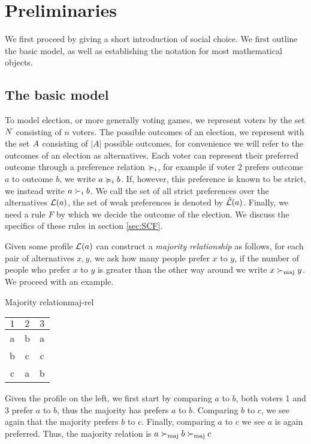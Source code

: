 \chapter{Preliminaries}
We first proceed by giving a short introduction of social choice. We first outline the basic model, as well as establishing the notation for most mathematical objects.

\section{The basic model}
To model election, or more generally voting games, we represent voters by the set $N$ consisting of $n$ voters. The possible outcomes of an election, we represent with the set $A$ consisting of $|A|$ possible outcomes, for convenience we will refer to the outcomes of an election as alternatives. Each voter can represent their preferred outcome through a preference relation $\succcurlyeq_i$, for example if voter 2 prefers outcome $a$ to outcome $b$, we write $a \succcurlyeq_i b$. If, however, this preference is known to be strict, we instead write $a \succ_i b$. We call the set of all strict preferences over the alternatives $\mathcal{L}(a)$, the set of weak preferences is denoted by $\hat{\mathcal{L}}(a)$. Finally, we need a rule $F$ by which we decide the outcome of the election. We discuss the specifics of these rules in section \cref{sec:SCF}.

Given some profile $\mathcal{L}(a)$ can construct a \textit{majority relationship} as follows, for each pair of alternatives $x,y$, we ask how many people prefer $x$ to $y$, if the number of people who prefer $x$ to $y$ is greater than the other way around we write $x  \succ_{\textnormal{maj}} y$. We proceed with an example.

\begin{example}{Majority relation}{maj-rel}
	\begin{minipage}{0.15\linewidth}
		\begin{tabular}{ccc}
			\toprule
			$1$ & $2$ & $3$ \\
			\midrule
			a   & b   & a   \\
			b   & c   & c   \\
			c   & a   & b   \\
			\bottomrule
		\end{tabular}
	\end{minipage}
	\hspace{0.02\linewidth}
	\begin{minipage}{0.78\linewidth}
		Given the profile on the left, we first start by comparing $a$ to $b$, both voters 1 and 3 prefer $a$ to $b$, thus the majority has prefers $a$ to $b$. Comparing $b$ to $c$, we see again that the majority prefers $b$ to $c$. Finally, comparing $a$ to $c$ we see $a$ is again preferred. Thus, the majority relation is $a \succ_{\textnormal{maj}} b \succ_{\textnormal{maj}} c$
	\end{minipage}
\end{example}

